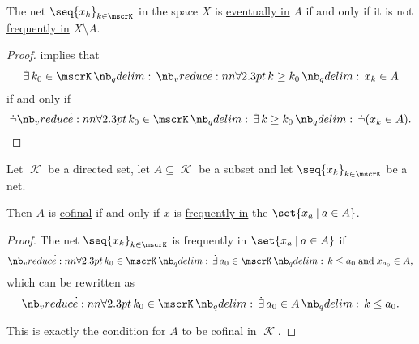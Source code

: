 \begin{proposition}\label{thm:eventually_and_frequently_in}
  The net \( \seq{ x_k }_{k \in \mscrK} \) in the space \( X \) is \hyperref[def:net_eventually_in]{eventually in} \( A \) if and only if it is not \hyperref[def:net_frequently_in]{frequently in} \( X \setminus A \).
\end{proposition}
\begin{proof}
   implies that
  \begin{equation*}
    \qexists {k_0 \in \mscrK} \qforall {k \geq k_0} x_k \in A
  \end{equation*}
  if and only if
  \begin{equation*}
    \synneg \qforall {k_0 \in \mscrK} \qexists {k \geq k_0} \synneg (x_k \in A).
  \end{equation*}
\end{proof}

\begin{proposition}\label{thm:cofinal_iff_frequently_in}
  Let \( \mscrK \) be a directed set, let \( A \subseteq \mscrK \) be a subset and let \( \seq{ x_k }_{k \in \mscrK} \) be a net.

  Then \( A \) is \hyperref[def:cofinal_set]{cofinal} if and only if \( x \) is \hyperref[def:net_frequently_in]{frequently in} the \( \set{ x_a \given a \in A } \).
\end{proposition}
\begin{proof}
  The net \( \seq{ x_k }_{k \in \mscrK} \) is frequently in \( \set{ x_a \given a \in A } \) if
  \begin{equation*}
    \qforall {k_0 \in \mscrK} \qexists {a_0 \in \mscrK} k \leq a_0 \T{and} x_{a_0} \in A,
  \end{equation*}
  which can be rewritten as
  \begin{equation*}
    \qforall {k_0 \in \mscrK} \qexists {a_0 \in A} k \leq a_0.
  \end{equation*}

  This is exactly the condition for \( A \) to be cofinal in \( \mscrK \).
\end{proof}

